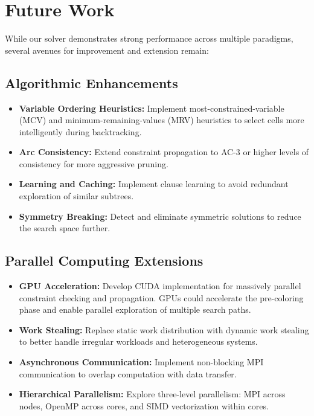 \section{Future Work}
\label{sec:future_work}
While our solver demonstrates strong performance across multiple paradigms, several avenues for improvement and extension remain:

\subsection{Algorithmic Enhancements}
\begin{itemize}
    \item \textbf{Variable Ordering Heuristics:} Implement most-constrained-variable (MCV) and minimum-remaining-values (MRV) heuristics to select cells more intelligently during backtracking.
    
    \item \textbf{Arc Consistency:} Extend constraint propagation to AC-3 or higher levels of consistency for more aggressive pruning.
    
    \item \textbf{Learning and Caching:} Implement clause learning to avoid redundant exploration of similar subtrees.
    
    \item \textbf{Symmetry Breaking:} Detect and eliminate symmetric solutions to reduce the search space further.
\end{itemize}

\subsection{Parallel Computing Extensions}
\begin{itemize}
    \item \textbf{GPU Acceleration:} Develop CUDA implementation for massively parallel constraint checking and propagation. GPUs could accelerate the pre-coloring phase and enable parallel exploration of multiple search paths.
    
    \item \textbf{Work Stealing:} Replace static work distribution with dynamic work stealing to better handle irregular workloads and heterogeneous systems.
    
    \item \textbf{Asynchronous Communication:} Implement non-blocking MPI communication to overlap computation with data transfer.
    
    \item \textbf{Hierarchical Parallelism:} Explore three-level parallelism: MPI across nodes, OpenMP across cores, and SIMD vectorization within cores.
\end{itemize}

